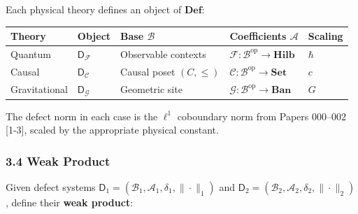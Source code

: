 \documentclass[
]{article}
\begin{document}
Each physical theory defines an object of \(\mathbf{Def}\):

\begin{longtable}[]{@{}
  >{\raggedright\arraybackslash}p{}
  >{\raggedright\arraybackslash}p{}
  >{\raggedright\arraybackslash}p{}
  >{\raggedright\arraybackslash}p{}
  >{\raggedright\arraybackslash}p{}@{}}
\toprule\noalign{}
\begin{minipage}[b]{\linewidth}\raggedright
Theory
\end{minipage} & \begin{minipage}[b]{\linewidth}\raggedright
Object
\end{minipage} & \begin{minipage}[b]{\linewidth}\raggedright
Base \(\mathcal{B}\)
\end{minipage} & \begin{minipage}[b]{\linewidth}\raggedright
Coefficients \(\mathcal{A}\)
\end{minipage} & \begin{minipage}[b]{\linewidth}\raggedright
Scaling
\end{minipage} \\
\midrule\noalign{}
\endhead
\bottomrule\noalign{}
\endlastfoot
Quantum & \(\mathsf{D}_\mathcal{F}\) & Observable contexts &
\(\mathcal{F} : \mathcal{B}^{\mathrm{op}} \to \mathbf{Hilb}\) &
\(\hbar\) \\
Causal & \(\mathsf{D}_\mathcal{C}\) & Causal poset \((C, \leq)\) &
\(\mathcal{C} : \mathcal{B}^{\mathrm{op}} \to \mathbf{Set}\) & \(c\) \\
Gravitational & \(\mathsf{D}_\mathcal{G}\) & Geometric site &
\(\mathcal{G} : \mathcal{B}^{\mathrm{op}} \to \mathbf{Ban}\) & \(G\) \\
\end{longtable}

The defect norm in each case is the \(\ell^1\) coboundary norm from
Papers 000--002 {[}1-3{]}, scaled by the appropriate physical constant.

\subsubsection{3.4 Weak Product}\label{weak-product}

Given defect systems
\(\mathsf{D}_1 = (\mathcal{B}_1, \mathcal{A}_1, \delta_1, \|\cdot\|_1)\)
and
\(\mathsf{D}_2 = (\mathcal{B}_2, \mathcal{A}_2, \delta_2, \|\cdot\|_2)\),
define their \textbf{weak product}:
\end{document}
